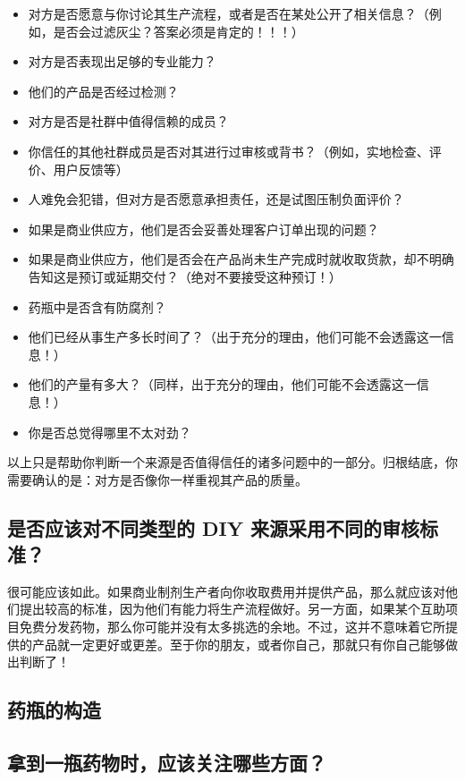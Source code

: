 \documentclass{article}
\begin{document}
\begin{itemize}
    \item 对方是否愿意与你讨论其生产流程，或者是否在某处公开了相关信息？（例如，是否会过滤灰尘？答案必须是肯定的！！！）
    \item 对方是否表现出足够的专业能力？
    \item 他们的产品是否经过检测？
    \item 对方是否是社群中值得信赖的成员？
    \item 你信任的其他社群成员是否对其进行过审核或背书？（例如，实地检查、评价、用户反馈等）
    \item 人难免会犯错，但对方是否愿意承担责任，还是试图压制负面评价？
    \item 如果是商业供应方，他们是否会妥善处理客户订单出现的问题？
    \item 如果是商业供应方，他们是否会在产品尚未生产完成时就收取货款，却不明确告知这是预订或延期交付？（绝对不要接受这种预订！）
    \item 药瓶中是否含有防腐剂？
    \item 他们已经从事生产多长时间了？（出于充分的理由，他们可能不会透露这一信息！）
    \item 他们的产量有多大？（同样，出于充分的理由，他们可能不会透露这一信息！）
    \item 你是否总觉得哪里不太对劲？
\end{itemize}

以上只是帮助你判断一个来源是否值得信任的诸多问题中的一部分。归根结底，你需要确认的是：对方是否像你一样重视其产品的质量。

\subsection{是否应该对不同类型的 DIY 来源采用不同的审核标准？}

很可能应该如此。如果商业制剂生产者向你收取费用并提供产品，那么就应该对他们提出较高的标准，因为他们有能力将生产流程做好。另一方面，如果某个互助项目免费分发药物，那么你可能并没有太多挑选的余地。不过，这并不意味着它所提供的产品就一定更好或更差。至于你的朋友，或者你自己，那就只有你自己能够做出判断了！

\subsection*{药瓶的构造}

\subsection{拿到一瓶药物时，应该关注哪些方面？}
\end{document}

